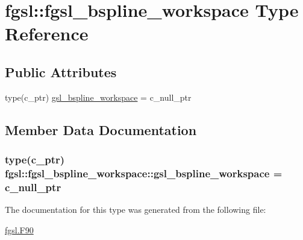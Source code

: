 \hypertarget{structfgsl_1_1fgsl__bspline__workspace}{}\section{fgsl\+:\+:fgsl\+\_\+bspline\+\_\+workspace Type Reference}
\label{structfgsl_1_1fgsl__bspline__workspace}
\subsection*{Public Attributes}
\begin{DoxyCompactItemize}
\item 
type(c\+\_\+ptr) \hyperlink{structfgsl_1_1fgsl__bspline__workspace_a4f8d27353e3f5e3aabbcfe07c0b932da}{gsl\+\_\+bspline\+\_\+workspace} = c\+\_\+null\+\_\+ptr
\end{DoxyCompactItemize}


\subsection{Member Data Documentation}
\hypertarget{structfgsl_1_1fgsl__bspline__workspace_a4f8d27353e3f5e3aabbcfe07c0b932da}{}
\subsubsection[{gsl\+\_\+bspline\+\_\+workspace}]{\setlength{\rightskip}{0pt plus 5cm}type(c\+\_\+ptr) fgsl\+::fgsl\+\_\+bspline\+\_\+workspace\+::gsl\+\_\+bspline\+\_\+workspace = c\+\_\+null\+\_\+ptr}\label{structfgsl_1_1fgsl__bspline__workspace_a4f8d27353e3f5e3aabbcfe07c0b932da}


The documentation for this type was generated from the following file\+:\begin{DoxyCompactItemize}
\item 
\hyperlink{fgsl_8F90}{fgsl.\+F90}\end{DoxyCompactItemize}
